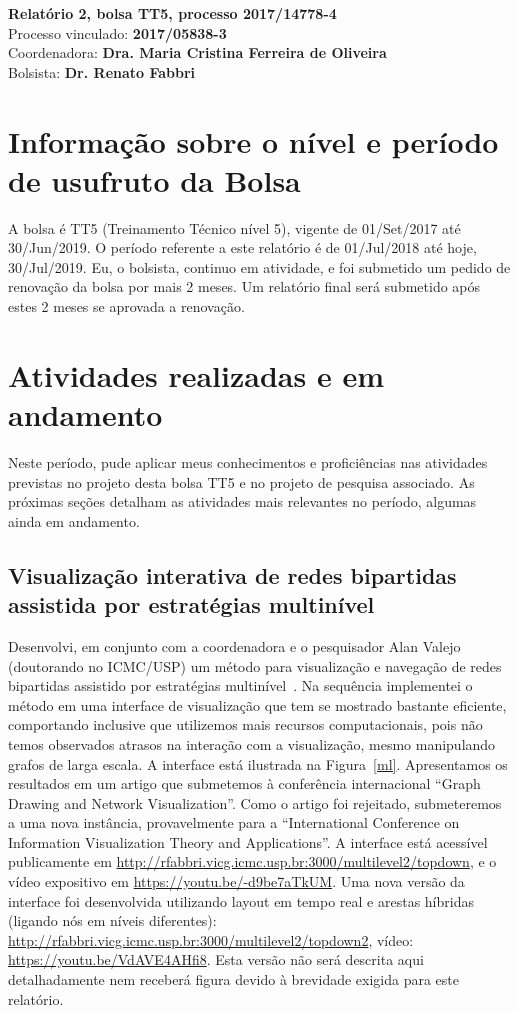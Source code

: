 \documentclass[a4paper, 11pt]{article}
\begin{document}
\noindent
\normalsize
 \textbf{Relatório 2, bolsa TT5, processo 2017/14778-4}\\
Processo vinculado: \textbf{2017/05838-3} \\
Coordenadora: \textbf{Dra. Maria Cristina Ferreira de Oliveira} \\
Bolsista: \textbf{Dr. Renato Fabbri}

\section{Informação sobre o nível e período de usufruto da Bolsa}
A bolsa é TT5 (Treinamento Técnico nível 5), vigente de 01/Set/2017 até 30/Jun/2019.
O período referente a este relatório é de 01/Jul/2018 até hoje, 30/Jul/2019.
Eu, o bolsista, continuo em atividade, e foi submetido um pedido de renovação da bolsa por mais 2 meses.
Um relatório final será submetido após estes 2 meses se aprovada a renovação.

\section{Atividades realizadas e em andamento}\label{desc}
Neste período, pude aplicar meus conhecimentos e proficiências nas atividades previstas no projeto desta bolsa TT5 e no projeto de pesquisa associado.
As próximas seções detalham as atividades mais relevantes no período, algumas ainda em andamento.

\subsection{Visualização interativa de redes bipartidas assistida por estratégias multinível}\label{sml}
Desenvolvi, em conjunto com a coordenadora e o pesquisador Alan Valejo (doutorando no ICMC/USP)
um método para visualização e navegação de redes bipartidas assistido por estratégias multinível~\cite{alan}.
    Na sequência implementei o método em uma interface de visualização que tem se mostrado bastante eficiente, comportando inclusive que utilizemos mais recursos computacionais, pois não temos observados atrasos na interação com a visualização, mesmo manipulando grafos de larga escala.
    A interface está ilustrada na Figura~\ref{ml}.
    Apresentamos os resultados em um artigo que submetemos à conferência internacional ``Graph Drawing and Network Visualization''.
    Como o artigo foi rejeitado, submeteremos a uma nova instância, provavelmente para a ``International Conference on Information Visualization Theory and Applications''.
    A interface está acessível  publicamente em \url{http://rfabbri.vicg.icmc.usp.br:3000/multilevel2/topdown}, e o vídeo expositivo em \url{https://youtu.be/-d9be7aTkUM}.
Uma nova versão da interface foi desenvolvida utilizando layout em tempo real e arestas híbridas (ligando nós em níveis diferentes):
\url{http://rfabbri.vicg.icmc.usp.br:3000/multilevel2/topdown2}, vídeo: \url{https://youtu.be/VdAVE4AHfi8}. Esta versão não será descrita aqui detalhadamente nem receberá figura devido à brevidade
exigida para este relatório.
\end{document}
